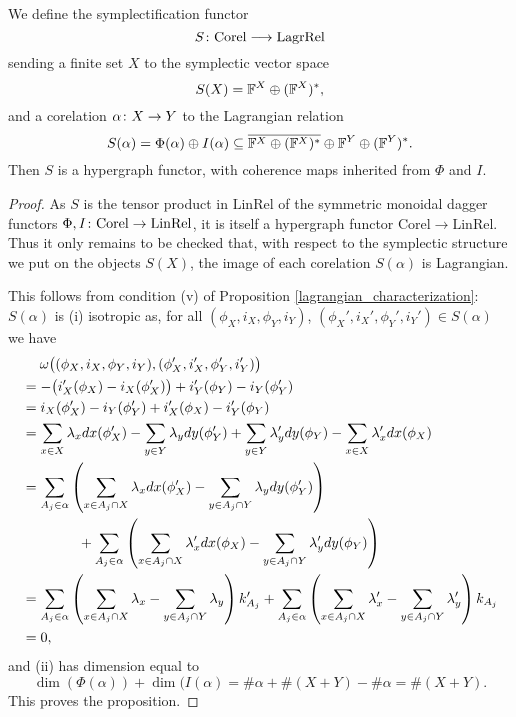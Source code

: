 \begin{proposition} \label{prop:sympfunctor}
  We define the symplectification functor
  \[
    S{\colon} \mathrm{Corel} \longrightarrow \mathrm{LagrRel}
  \]
  sending a finite set $X$ to the symplectic vector space
\[
  S(X) = {\mathbb F}^X \oplus ({\mathbb F}^X)^\ast,
\]
 and a corelation $\alpha{\colon} X \to Y$ to the Lagrangian relation
\[
  S(\alpha) = \Phi(\alpha) \oplus I(\alpha) \subseteq \overline{{\mathbb F}^X \oplus
  ({\mathbb F}^X)^\ast}\oplus {\mathbb F}^Y \oplus ({\mathbb F}^Y)^\ast.
\]
  Then $S$ is a hypergraph functor, with coherence maps inherited
  from $\Phi$ and $I$.
\end{proposition}
\begin{proof}
  As $S$ is the tensor product in $\mathrm{LinRel}$ of the symmetric monoidal
  dagger functors $\Phi, I{\colon} \mathrm{Corel} \to \mathrm{LinRel}$, it is
  itself a hypergraph functor $\mathrm{Corel} \to
  \mathrm{LinRel}$. Thus it only remains to be checked that, with respect to the
  symplectic structure we put on the objects $S(X)$, the image of each
  corelation $S(\alpha)$ is Lagrangian. 

  This follows from condition (v) of Proposition
  \ref{lagrangian_characterization}: $S(\alpha)$ is (i) isotropic as, for all 
  $(\phi_X,i_X,\phi_Y,i_Y)$, $(\phi_X',i_X',\phi_Y',i_Y') \in S(\alpha)$ we have
  \begin{align*}
    &\phantom{=} \enskip
    \omega\big((\phi_X,i_X,\phi_Y,i_Y),(\phi_X',i_X',\phi_Y',i_Y')\big)
    \\
    &= -\big(i_X'(\phi_X)-i_X(\phi_X')\big) + i_Y'(\phi_Y)-i_Y(\phi_Y') \\
    &= i_X(\phi_X')-i_Y(\phi_Y') + i_X'(\phi_X)-i_Y'(\phi_Y) \\
    &= \sum_{x \in X} \lambda_x dx(\phi_X') - \sum_{y \in Y} \lambda_y dy(\phi_Y') +
    \sum_{y \in Y} \lambda_y' dy(\phi_Y) - \sum_{x \in X} \lambda_x' dx(\phi_X)\\
    &= \sum_{A_j \in \alpha}\left(\sum_{x \in A_j \cap X} \lambda_x dx(\phi_X') -
    \sum_{y \in A_j \cap Y} \lambda_y dy(\phi_Y')\right) \\
    &\qquad \qquad+ \sum_{A_j \in
    \alpha}\left(\sum_{x \in A_j \cap X} \lambda_x'dx(\phi_X) - \sum_{y \in A_j
    \cap Y} \lambda_y' dy(\phi_Y)\right)\\
    &= \sum_{A_j \in \alpha}\left(\sum_{x \in A_j \cap X} \lambda_x - \sum_{y \in
    A_j \cap Y} \lambda_y \right)k'_{A_j} + \sum_{A_j \in \alpha}\left(\sum_{x \in
    A_j \cap X} \lambda_x'- \sum_{y \in A_j \cap Y} \lambda_y'\right)k_{A_j}\\
    &= 0,
  \end{align*}
  and (ii) has dimension equal to 
  \[
    \dim(\Phi(\alpha))+ \dim(I(\alpha) = \#\alpha+\#(X+Y) - \#\alpha= \#(X+Y).
  \]
  This proves the proposition.
\end{proof}

